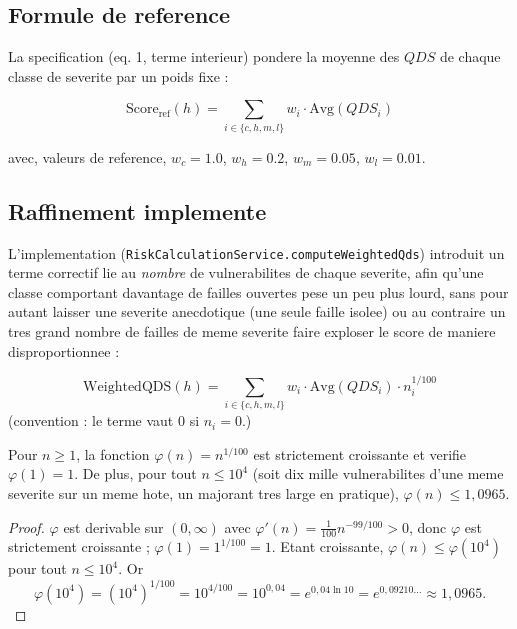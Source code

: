 \subsection{Formule de reference}

La specification (eq. 1, terme interieur) pondere la moyenne des $QDS$ de chaque
classe de severite par un poids fixe :

\begin{equation}
\mathrm{Score}_{\text{ref}}(h) = \sum_{i\in\{c,h,m,l\}} w_i \cdot \mathrm{Avg}(QDS_i)
\label{eq:qds-ref}
\end{equation}

avec, valeurs de reference, $w_c=1.0$, $w_h=0.2$, $w_m=0.05$, $w_l=0.01$.

\subsection{Raffinement implemente}

L'implementation (\texttt{RiskCalculationService.computeWeightedQds}) introduit un
terme correctif lie au \emph{nombre} de vulnerabilites de chaque severite, afin
qu'une classe comportant davantage de failles ouvertes pese un peu plus lourd, sans
pour autant laisser une severite anecdotique (une seule faille isolee) ou au
contraire un tres grand nombre de failles de meme severite faire exploser le score de
maniere disproportionnee :

\begin{equation}
\mathrm{WeightedQDS}(h) = \sum_{i\in\{c,h,m,l\}} w_i \cdot \mathrm{Avg}(QDS_i) \cdot n_i^{1/100}
\label{eq:qds-impl}
\end{equation}
\noindent (convention : le terme vaut $0$ si $n_i = 0$.)

\begin{propriete}
\label{prop:count-damping}
Pour $n\ge 1$, la fonction $\varphi(n)=n^{1/100}$ est strictement croissante et
verifie $\varphi(1)=1$. De plus, pour tout $n\le 10^{4}$ (soit dix mille
vulnerabilites d'une meme severite sur un meme hote, un majorant tres large en
pratique), $\varphi(n) \le 1{,}0965$.
\end{propriete}

\begin{proof}
$\varphi$ est derivable sur $(0,\infty)$ avec
$\varphi'(n) = \tfrac{1}{100}n^{-99/100} > 0$, donc $\varphi$ est strictement
croissante ; $\varphi(1)=1^{1/100}=1$.
Etant croissante, $\varphi(n)\le\varphi(10^4)$ pour tout $n\le 10^4$. Or
\[
\varphi(10^4) = (10^4)^{1/100} = 10^{4/100} = 10^{0{,}04}
             = e^{0{,}04\ln 10} = e^{0{,}09210\ldots} \approx 1{,}0965 .
\]
\end{proof}

